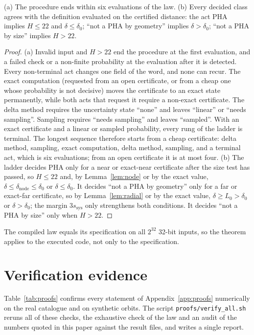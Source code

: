 \documentclass[make,article,submit,moreauthors]{Definitions/mdpi}
\begin{document}
\begin{Theorem}\label{thm:law}
(a) The procedure ends within six evaluations of the law. (b) Every decided class agrees with the definition evaluated on the certified distance: the act PHA implies $H \le 22$ and $\delta \le \delta_0$; ``not a PHA by geometry'' implies $\delta > \delta_0$; ``not a PHA by size'' implies $H > 22$.
\end{Theorem}
\begin{proof}
(a) Invalid input and $H > 22$ end the procedure at the first evaluation, and a failed check or a non-finite probability at the evaluation after it is detected. Every non-terminal act changes one field of the word, and none can recur. The exact computation (requested from an open certificate, or from a cheap one whose probability is not decisive) moves the certificate to an exact state permanently, while both acts that request it require a non-exact certificate. The delta method requires the uncertainty state ``none'' and leaves ``linear'' or ``needs sampling''. Sampling requires ``needs sampling'' and leaves ``sampled''. With an exact certificate and a linear or sampled probability, every rung of the ladder is terminal. The longest sequence therefore starts from a cheap certificate: delta method, sampling, exact computation, delta method, sampling, and a terminal act, which is six evaluations; from an open certificate it is at most four.
(b) The ladder decides PHA only for a near or exact-near certificate after the size test has passed, so $H \le 22$ and, by Lemma~\ref{lem:node} or by the exact value, $\delta \le \delta_{\mathrm{node}} \le \delta_0$ or $\delta \le \delta_0$. It decides ``not a PHA by geometry'' only for a far or exact-far certificate, so by Lemma~\ref{lem:radial} or by the exact value, $\delta \ge L_0 > \delta_0$ or $\delta > \delta_0$; the margin $3s_{\mathrm{sys}}$ only strengthens both conditions. It decides ``not a PHA by size'' only when $H > 22$.
\end{proof}
The compiled law equals its specification on all $2^{32}$ 32-bit inputs, so the theorem applies to the executed code, not only to the specification.

\section{Verification evidence}
\label{app:verify}
Table~\ref{tab:proofs} confirms every statement of Appendix~\ref{app:proofs} numerically on the real catalogue and on synthetic orbits. The script \texttt{proofs/verify\_all.sh} reruns all of these checks, the exhaustive check of the law and an audit of the numbers quoted in this paper against the result files, and writes a single report.
\end{document}
